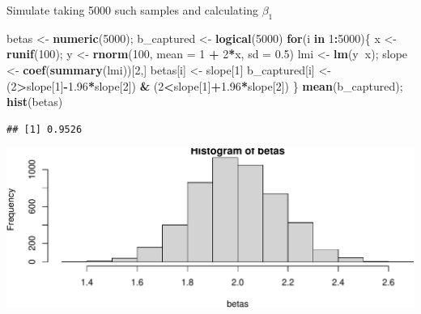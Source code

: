 \documentclass[
  ignorenonframetext,
]{beamer}
\newenvironment{Shaded}{\begin{snugshade}}{\end{snugshade}}
\newcommand{\ControlFlowTok}[1]{\textcolor[rgb]{0.13,0.29,0.53}{\textbf{#1}}}
\newcommand{\DataTypeTok}[1]{\textcolor[rgb]{0.13,0.29,0.53}{#1}}
\newcommand{\DecValTok}[1]{\textcolor[rgb]{0.00,0.00,0.81}{#1}}
\newcommand{\FloatTok}[1]{\textcolor[rgb]{0.00,0.00,0.81}{#1}}
\newcommand{\KeywordTok}[1]{\textcolor[rgb]{0.13,0.29,0.53}{\textbf{#1}}}
\newcommand{\NormalTok}[1]{#1}
\newcommand{\OperatorTok}[1]{\textcolor[rgb]{0.81,0.36,0.00}{\textbf{#1}}}
\newcommand{\StringTok}[1]{\textcolor[rgb]{0.31,0.60,0.02}{#1}}
\begin{document}
\begin{frame}[fragile]{Simulate taking 5000 such samples and calculating
\(\beta_1\)}
\protect\hypertarget{simulate-taking-5000-such-samples-and-calculating-beta_1}{}

\scriptsize

\begin{Shaded}
\begin{Highlighting}[]
\NormalTok{betas <-}\StringTok{ }\KeywordTok{numeric}\NormalTok{(}\DecValTok{5000}\NormalTok{); b_captured <-}\StringTok{ }\KeywordTok{logical}\NormalTok{(}\DecValTok{5000}\NormalTok{)}
\ControlFlowTok{for}\NormalTok{(i }\ControlFlowTok{in} \DecValTok{1}\OperatorTok{:}\DecValTok{5000}\NormalTok{)\{}
\NormalTok{ x <-}\StringTok{ }\KeywordTok{runif}\NormalTok{(}\DecValTok{100}\NormalTok{); y <-}\StringTok{ }\KeywordTok{rnorm}\NormalTok{(}\DecValTok{100}\NormalTok{, }\DataTypeTok{mean =} \DecValTok{1} \OperatorTok{+}\StringTok{ }\DecValTok{2}\OperatorTok{*}\NormalTok{x, }\DataTypeTok{sd =} \FloatTok{0.5}\NormalTok{)}
\NormalTok{ lmi <-}\StringTok{ }\KeywordTok{lm}\NormalTok{(y}\OperatorTok{~}\NormalTok{x); slope <-}\StringTok{ }\KeywordTok{coef}\NormalTok{(}\KeywordTok{summary}\NormalTok{(lmi))[}\DecValTok{2}\NormalTok{,]}
\NormalTok{ betas[i] <-}\StringTok{ }\NormalTok{slope[}\DecValTok{1}\NormalTok{]}
\NormalTok{ b_captured[i] <-}\StringTok{ }\NormalTok{(}\DecValTok{2}\OperatorTok{>}\NormalTok{slope[}\DecValTok{1}\NormalTok{]}\OperatorTok{-}\FloatTok{1.96}\OperatorTok{*}\NormalTok{slope[}\DecValTok{2}\NormalTok{]) }\OperatorTok{&}\StringTok{ }\NormalTok{(}\DecValTok{2}\OperatorTok{<}\NormalTok{slope[}\DecValTok{1}\NormalTok{]}\OperatorTok{+}\FloatTok{1.96}\OperatorTok{*}\NormalTok{slope[}\DecValTok{2}\NormalTok{]) }
\NormalTok{\}}
\KeywordTok{mean}\NormalTok{(b_captured); }\KeywordTok{hist}\NormalTok{(betas)}
\end{Highlighting}
\end{Shaded}

\begin{verbatim}
## [1] 0.9526
\end{verbatim}

\includegraphics{Regression_and_ANOVA_files/figure-beamer/unnamed-chunk-7-1.pdf}

\end{frame}
\end{document}
